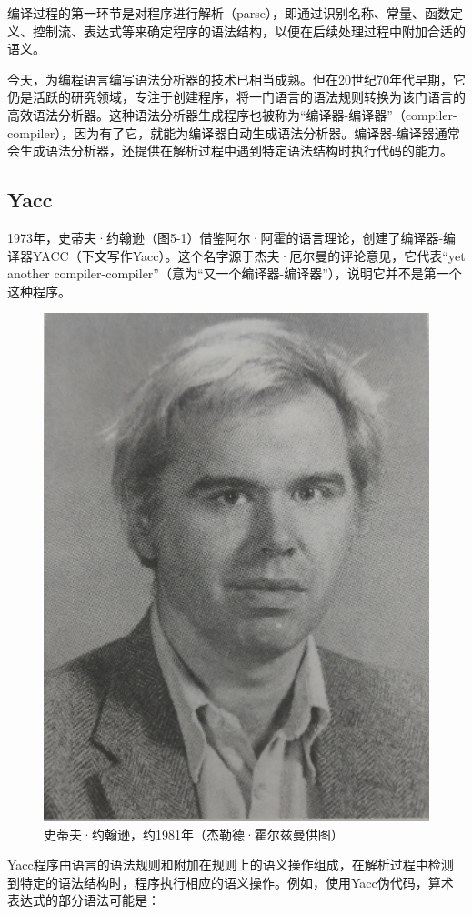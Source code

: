 \documentclass[a4paper,12pt,UTF8,twoside]{ctexbook}
\begin{document}
编译过程的第一环节是对程序进行解析（parse），即通过识别名称、常量、函数定义、控制流、表达式等来确定程序的语法结构，以便在后续处理过程中附加合适的语义。

今天，为编程语言编写语法分析器的技术已相当成熟。但在20世纪70年代早期，它仍是活跃的研究领域，专注于创建程序，将一门语言的语法规则转换为该门语言的高效语法分析器。这种语法分析器生成程序也被称为“编译器-编译器”（compiler-compiler），因为有了它，就能为编译器自动生成语法分析器。编译器-编译器通常会生成语法分析器，还提供在解析过程中遇到特定语法结构时执行代码的能力。

\subsection{Yacc}

1973年，史蒂夫·约翰逊（图5-1）借鉴阿尔·阿霍的语言理论，创建了编译器-编译器YACC（下文写作Yacc）。这个名字源于杰夫·厄尔曼的评论意见，它代表“yet another compiler-compiler”（意为“又一个编译器-编译器”），说明它并不是第一个这种程序。

\begin{figure}[htbp]
	\centering
	\includegraphics[width=0.7\linewidth]{40}
	\caption{史蒂夫·约翰逊，约1981年（杰勒德·霍尔兹曼供图）}
	\label{fig:1}
\end{figure}

Yacc程序由语言的语法规则和附加在规则上的语义操作组成，在解析过程中检测到特定的语法结构时，程序执行相应的语义操作。例如，使用Yacc伪代码，算术表达式的部分语法可能是：
\end{document}
